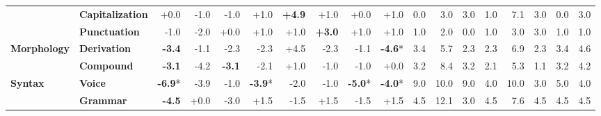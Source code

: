 \begin{table}[h]
{\begin{tabular}{llrrrrrrrrrrrrrrrr}
  & \textbf{Capitalization} & \cellcolor{red!0} +0.0 & \cellcolor{red!1} -1.0 & \cellcolor{red!1} -1.0 & \cellcolor{green!1} +1.0 & \cellcolor{green!9} \textbf{+4.9} & \cellcolor{green!2} +1.0 & \cellcolor{red!0} +0.0 & \cellcolor{green!1} +1.0 & \cellcolor{blue!0} 0.0 & \cellcolor{blue!8} 3.0 & \cellcolor{blue!8} 3.0 & \cellcolor{blue!3} 1.0 & \cellcolor{blue!18} 7.1 & \cellcolor{blue!8} 3.0 & \cellcolor{blue!0} 0.0 & \cellcolor{blue!8} 3.0 \\
  & \textbf{Punctuation} & \cellcolor{red!1} -1.0 & \cellcolor{red!3} -2.0 & \cellcolor{red!0} +0.0 & \cellcolor{green!1} +1.0 & \cellcolor{green!1} +1.0 & \cellcolor{green!5} \textbf{+3.0} & \cellcolor{green!1} +1.0 & \cellcolor{green!1} +1.0 & \cellcolor{blue!3} 1.0 & \cellcolor{blue!5} 2.0 & \cellcolor{blue!0} 0.0 & \cellcolor{blue!3} 1.0 & \cellcolor{blue!8} 3.0 & \cellcolor{blue!8} 3.0 & \cellcolor{blue!3} 1.0 & \cellcolor{blue!3} 1.0 \\
\midrule
\textbf{Morphology} & \textbf{Derivation} & \cellcolor{red!6} \textbf{-3.4} & \cellcolor{red!2} -1.1 & \cellcolor{red!4} -2.3 & \cellcolor{red!4} -2.3 & \cellcolor{green!9} +4.5 & \cellcolor{red!4} -2.3 & \cellcolor{red!2} -1.1 & \cellcolor{red!9} \textbf{-4.6}* & \cellcolor{blue!9} 3.4 & \cellcolor{blue!15} 5.7 & \cellcolor{blue!6} 2.3 & \cellcolor{blue!6} 2.3 & \cellcolor{blue!18} 6.9 & \cellcolor{blue!6} 2.3 & \cellcolor{blue!9} 3.4 & \cellcolor{blue!12} 4.6 \\
  & \textbf{Compound} & \cellcolor{red!6} \textbf{-3.1} & \cellcolor{red!8} -4.2 & \cellcolor{red!6} \textbf{-3.1} & \cellcolor{red!4} -2.1 & \cellcolor{green!2} +1.0 & \cellcolor{red!2} -1.0 & \cellcolor{red!2} -1.0 & \cellcolor{red!0} +0.0 & \cellcolor{blue!8} 3.2 & \cellcolor{blue!22} 8.4 & \cellcolor{blue!8} 3.2 & \cellcolor{blue!5} 2.1 & \cellcolor{blue!14} 5.3 & \cellcolor{blue!3} 1.1 & \cellcolor{blue!8} 3.2 & \cellcolor{blue!11} 4.2 \\
\midrule
\textbf{Syntax} & \textbf{Voice} & \cellcolor{red!13} \textbf{-6.9}* & \cellcolor{red!7} -3.9 & \cellcolor{red!1} -1.0 & \cellcolor{red!7} \textbf{-3.9}* & \cellcolor{red!3} -2.0 & \cellcolor{red!1} -1.0 & \cellcolor{red!9} \textbf{-5.0}* & \cellcolor{red!7} \textbf{-4.0}* & \cellcolor{blue!23} 9.0 & \cellcolor{blue!26} 10.0 & \cellcolor{blue!23} 9.0 & \cellcolor{blue!10} 4.0 & \cellcolor{blue!26} 10.0 & \cellcolor{blue!8} 3.0 & \cellcolor{blue!13} 5.0 & \cellcolor{blue!10} 4.0 \\
  & \textbf{Grammar} & \cellcolor{red!8} \textbf{-4.5} & \cellcolor{red!0} +0.0 & \cellcolor{red!5} -3.0 & \cellcolor{green!2} +1.5 & \cellcolor{red!2} -1.5 & \cellcolor{green!2} +1.5 & \cellcolor{red!2} -1.5 & \cellcolor{green!2} +1.5 & \cellcolor{blue!12} 4.5 & \cellcolor{blue!31} 12.1 & \cellcolor{blue!8} 3.0 & \cellcolor{blue!12} 4.5 & \cellcolor{blue!20} 7.6 & \cellcolor{blue!12} 4.5 & \cellcolor{blue!12} 4.5 & \cellcolor{blue!12} 4.5 \\

\end{tabular}}
\end{table}
